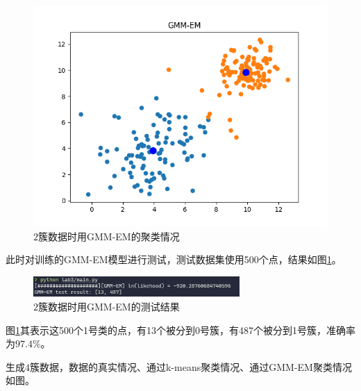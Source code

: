 \begin{figure}[htbp]
\begin{minipage}[t]{0.3\linewidth}
        \centering
        \includegraphics[width=\textwidth]{figures/Figure_9.png}
        \caption{$2$簇数据时用GMM-EM的聚类情况}
    \end{minipage}
\end{figure}

此时对训练的GMM-EM模型进行测试，测试数据集使用500个点，结果如图\ref{cluster2-test}。

\begin{figure}[htbp]
    \centering
    \includegraphics[width=0.7\textwidth]{figures/Figure_10.png}
    \caption{$2$簇数据时用GMM-EM的测试结果}
    \label{cluster2-test}
\end{figure}

图\ref{cluster2-test}其表示这500个1号类的点，有13个被分到0号簇，有487个被分到1号簇，准确率为$97.4\%$。

生成$4$簇数据，数据的真实情况、通过k-means聚类情况、通过GMM-EM聚类情况如图。

